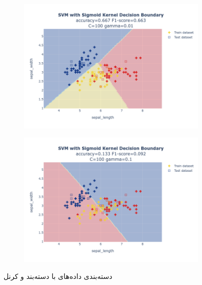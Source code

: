 \documentclass{article}
\begin{document}
\begin{figure}
\begin{subfigure}{0.3\textwidth}
        \includegraphics[scale=.13]{images/implementation/q1/sigmoid_kernel/sepal_length_sepal_width_100_0.01.png}
    \end{subfigure}
    \hfill
    \begin{subfigure}{0.3\textwidth}
        \centering
        \includegraphics[scale=.13]{images/implementation/q1/sigmoid_kernel/sepal_length_sepal_width_100_0.1.png}
    \end{subfigure}
    \caption{دسته‌بندی داده‌های  با دسته‌بند  و کرنل }
    \label{sigmoid_kernel}
\end{figure}
\end{document}

